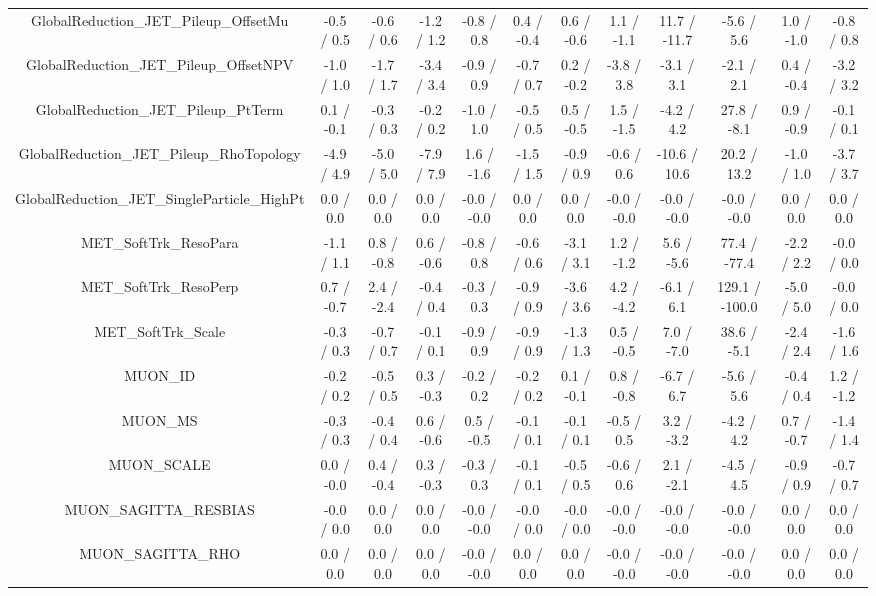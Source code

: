\begin{table}[htbp]
\begin{center}
\begin{tabular}{|c|c|c|c|c|c|c|c|c|c|c|c|}
  GlobalReduction_JET_Pileup_OffsetMu & -0.5 / 0.5 & -0.6 / 0.6 & -1.2 / 1.2 & -0.8 / 0.8 & 0.4 / -0.4 & 0.6 / -0.6 & 1.1 / -1.1 & 11.7 / -11.7 & -5.6 / 5.6 & 1.0 / -1.0 & -0.8 / 0.8 \\ 
  GlobalReduction_JET_Pileup_OffsetNPV & -1.0 / 1.0 & -1.7 / 1.7 & -3.4 / 3.4 & -0.9 / 0.9 & -0.7 / 0.7 & 0.2 / -0.2 & -3.8 / 3.8 & -3.1 / 3.1 & -2.1 / 2.1 & 0.4 / -0.4 & -3.2 / 3.2 \\ 
  GlobalReduction_JET_Pileup_PtTerm & 0.1 / -0.1 & -0.3 / 0.3 & -0.2 / 0.2 & -1.0 / 1.0 & -0.5 / 0.5 & 0.5 / -0.5 & 1.5 / -1.5 & -4.2 / 4.2 & 27.8 / -8.1 & 0.9 / -0.9 & -0.1 / 0.1 \\ 
  GlobalReduction_JET_Pileup_RhoTopology & -4.9 / 4.9 & -5.0 / 5.0 & -7.9 / 7.9 & 1.6 / -1.6 & -1.5 / 1.5 & -0.9 / 0.9 & -0.6 / 0.6 & -10.6 / 10.6 & 20.2 / 13.2 & -1.0 / 1.0 & -3.7 / 3.7 \\ 
  GlobalReduction_JET_SingleParticle_HighPt & 0.0 / 0.0 & 0.0 / 0.0 & 0.0 / 0.0 & -0.0 / -0.0 & 0.0 / 0.0 & 0.0 / 0.0 & -0.0 / -0.0 & -0.0 / -0.0 & -0.0 / -0.0 & 0.0 / 0.0 & 0.0 / 0.0 \\ 
  MET_SoftTrk_ResoPara & -1.1 / 1.1 & 0.8 / -0.8 & 0.6 / -0.6 & -0.8 / 0.8 & -0.6 / 0.6 & -3.1 / 3.1 & 1.2 / -1.2 & 5.6 / -5.6 & 77.4 / -77.4 & -2.2 / 2.2 & -0.0 / 0.0 \\ 
  MET_SoftTrk_ResoPerp & 0.7 / -0.7 & 2.4 / -2.4 & -0.4 / 0.4 & -0.3 / 0.3 & -0.9 / 0.9 & -3.6 / 3.6 & 4.2 / -4.2 & -6.1 / 6.1 & 129.1 / -100.0 & -5.0 / 5.0 & -0.0 / 0.0 \\ 
  MET_SoftTrk_Scale & -0.3 / 0.3 & -0.7 / 0.7 & -0.1 / 0.1 & -0.9 / 0.9 & -0.9 / 0.9 & -1.3 / 1.3 & 0.5 / -0.5 & 7.0 / -7.0 & 38.6 / -5.1 & -2.4 / 2.4 & -1.6 / 1.6 \\ 
  MUON_ID & -0.2 / 0.2 & -0.5 / 0.5 & 0.3 / -0.3 & -0.2 / 0.2 & -0.2 / 0.2 & 0.1 / -0.1 & 0.8 / -0.8 & -6.7 / 6.7 & -5.6 / 5.6 & -0.4 / 0.4 & 1.2 / -1.2 \\ 
  MUON_MS & -0.3 / 0.3 & -0.4 / 0.4 & 0.6 / -0.6 & 0.5 / -0.5 & -0.1 / 0.1 & -0.1 / 0.1 & -0.5 / 0.5 & 3.2 / -3.2 & -4.2 / 4.2 & 0.7 / -0.7 & -1.4 / 1.4 \\ 
  MUON_SCALE & 0.0 / -0.0 & 0.4 / -0.4 & 0.3 / -0.3 & -0.3 / 0.3 & -0.1 / 0.1 & -0.5 / 0.5 & -0.6 / 0.6 & 2.1 / -2.1 & -4.5 / 4.5 & -0.9 / 0.9 & -0.7 / 0.7 \\ 
  MUON_SAGITTA_RESBIAS & -0.0 / 0.0 & 0.0 / 0.0 & 0.0 / 0.0 & -0.0 / -0.0 & -0.0 / 0.0 & -0.0 / 0.0 & -0.0 / -0.0 & -0.0 / -0.0 & -0.0 / -0.0 & 0.0 / 0.0 & 0.0 / 0.0 \\ 
  MUON_SAGITTA_RHO & 0.0 / 0.0 & 0.0 / 0.0 & 0.0 / 0.0 & -0.0 / -0.0 & 0.0 / 0.0 & 0.0 / 0.0 & -0.0 / -0.0 & -0.0 / -0.0 & -0.0 / -0.0 & 0.0 / 0.0 & 0.0 / 0.0 \\ 

\end{tabular}
\end{center}
\end{table}
